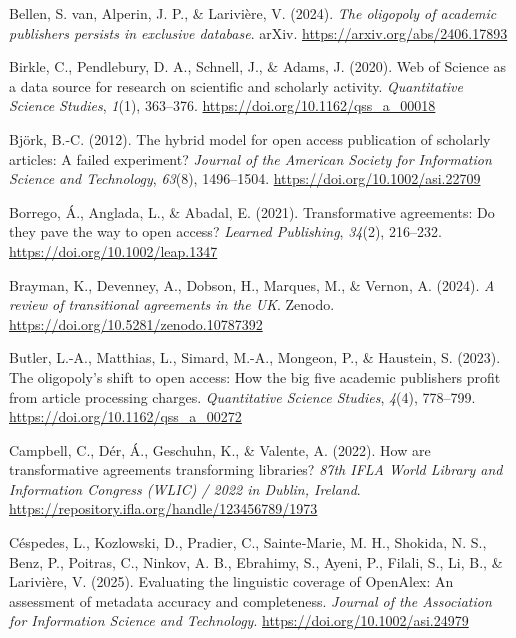 \documentclass[a4paper,man,floatsintext,longtable,noextraspace,10pt]{apa6}
\newlength{\cslhangindent}
\newenvironment{CSLReferences}[2] %
{\begin{list}{}{%
  \setlength{\itemindent}{0pt}
  \setlength{\leftmargin}{0pt}
  \setlength{\parsep}{0pt}
  \ifodd #1
  \setlength{\leftmargin}{\cslhangindent}
  \setlength{\itemindent}{-1\cslhangindent}
  \fi
  \setlength{\itemsep}{#2\baselineskip}}}
{\end{list}}
\begin{document}
\begin{CSLReferences}{1}{0}
Bellen, S. van, Alperin, J. P., \& Larivière, V. (2024). \emph{The
oligopoly of academic publishers persists in exclusive database}. arXiv.
\url{https://arxiv.org/abs/2406.17893}

Birkle, C., Pendlebury, D. A., Schnell, J., \& Adams, J. (2020). {Web of
Science} as a data source for research on scientific and scholarly
activity. \emph{Quantitative Science Studies}, \emph{1}(1), 363--376.
\url{https://doi.org/10.1162/qss_a_00018}

Björk, B.-C. (2012). The hybrid model for open access publication of
scholarly articles: A failed experiment? \emph{Journal of the American
Society for Information Science and Technology}, \emph{63}(8),
1496--1504. \url{https://doi.org/10.1002/asi.22709}

Borrego, Á., Anglada, L., \& Abadal, E. (2021). Transformative
agreements: Do they pave the way to open access? \emph{Learned
Publishing}, \emph{34}(2), 216--232.
\url{https://doi.org/10.1002/leap.1347}

Brayman, K., Devenney, A., Dobson, H., Marques, M., \& Vernon, A.
(2024). \emph{A review of transitional agreements in the {UK}}. Zenodo.
\url{https://doi.org/10.5281/zenodo.10787392}

Butler, L.-A., Matthias, L., Simard, M.-A., Mongeon, P., \& Haustein, S.
(2023). The oligopoly's shift to open access: How the big five academic
publishers profit from article processing charges. \emph{Quantitative
Science Studies}, \emph{4}(4), 778--799.
\url{https://doi.org/10.1162/qss_a_00272}

Campbell, C., Dér, Á., Geschuhn, K., \& Valente, A. (2022). How are
transformative agreements transforming libraries? \emph{87th IFLA World
Library and Information Congress (WLIC) / 2022 in Dublin, Ireland}.
\url{https://repository.ifla.org/handle/123456789/1973}

Céspedes, L., Kozlowski, D., Pradier, C., Sainte‐Marie, M. H., Shokida,
N. S., Benz, P., Poitras, C., Ninkov, A. B., Ebrahimy, S., Ayeni, P.,
Filali, S., Li, B., \& Larivière, V. (2025). Evaluating the linguistic
coverage of {OpenAlex}: An assessment of metadata accuracy and
completeness. \emph{Journal of the Association for Information Science
and Technology}. \url{https://doi.org/10.1002/asi.24979}


\end{CSLReferences}
\end{document}
